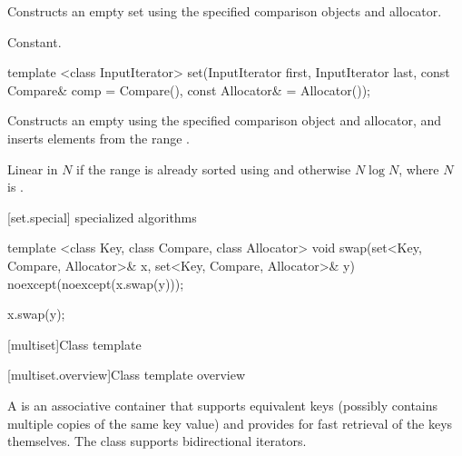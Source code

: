 \begin{itemdescr}
\pnum
\effects
Constructs an empty set using the specified comparison objects and allocator.

\pnum
\complexity
Constant.
\end{itemdescr}

%
%
\begin{itemdecl}
template <class InputIterator>
  set(InputIterator first, InputIterator last,
      const Compare& comp = Compare(), const Allocator& = Allocator());
\end{itemdecl}

\begin{itemdescr}
\pnum
\effects
Constructs an empty
using the specified comparison object and allocator,
and inserts elements from the range
.

\pnum
\complexity
Linear in $N$ if the range
is already sorted using 
and otherwise $N \log{N}$,
where $N$ is
.
\end{itemdescr}

[set.special]{ specialized algorithms}

%
%
\begin{itemdecl}
template <class Key, class Compare, class Allocator>
  void swap(set<Key, Compare, Allocator>& x,
            set<Key, Compare, Allocator>& y)
    noexcept(noexcept(x.swap(y)));
\end{itemdecl}

\begin{itemdescr}
\pnum
\effects
\begin{codeblock}
x.swap(y);
\end{codeblock}
\end{itemdescr}

[multiset]{Class template }

[multiset.overview]{Class template  overview}

\pnum
{}%
A
is an associative container that supports equivalent keys (possibly contains multiple copies of
the same key value) and provides for fast retrieval of the keys themselves.
The
 class
supports bidirectional iterators.

